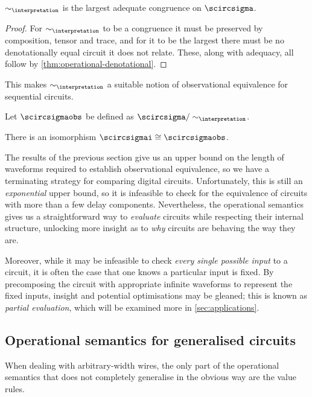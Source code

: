 \documentclass{lmcs}
\begin{document}
\begin{cor}
    \(\sim_\interpretation\) is the largest adequate congruence on
    \(\scircsigma\).
\end{cor}
\begin{proof}
    For \(\sim_\interpretation\) to be a congruence it must be preserved by
    composition, tensor and trace, and for it to be the largest there must be
    no denotationally equal circuit it does not relate.
    These, along with adequacy, all follow by
    \autoref{thm:operational-denotational}.
\end{proof}

This makes \(\sim_\interpretation\) a suitable notion of observational
equivalence for sequential circuits.

\begin{defi}
    Let \(\scircsigmaobs\) be defined as
    \(\scircsigma / \sim_{\interpretation}\).
\end{defi}

\begin{cor}
    There is an isomorphism \(\scircsigmai \cong \scircsigmaobs\).
\end{cor}

The results of the previous section give us an upper bound on the length of
waveforms required to establish observational equivalence, so we have a
terminating strategy for comparing digital circuits.
Unfortunately, this is still an \emph{exponential} upper bound, so it is
infeasible to check for the equivalence of circuits with more than a few delay
components.
Nevertheless, the operational semantics gives us a straightforward way to
\emph{evaluate} circuits while respecting their internal structure, unlocking
more insight as to \emph{why} circuits are behaving the way they are.

Moreover, while it may be infeasible to check \emph{every single possible input}
to a circuit, it is often the case that one knows a particular input is fixed.
By precomposing the circuit with appropriate infinite waveforms to represent the
fixed inputs, insight and potential optimisations may be gleaned; this is known
as \emph{partial evaluation}, which will be examined more
in \autoref{sec:applications}.

\subsection{Operational semantics for generalised circuits}

When dealing with arbitrary-width wires, the only part of the operational
semantics that does not completely generalise in the obvious way are the value
rules.
\end{document}
